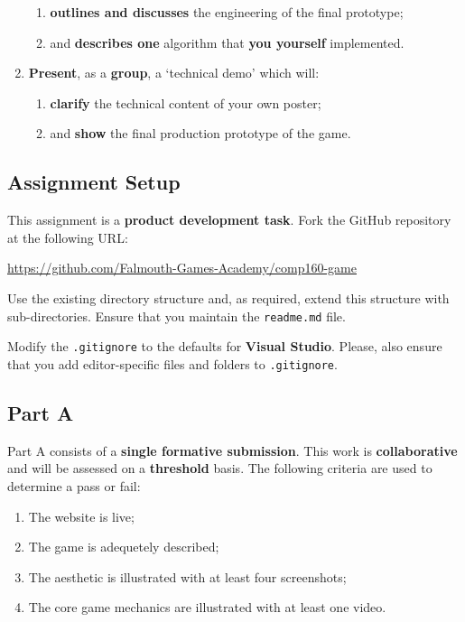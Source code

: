 \documentclass{../fal_assignment}
\begin{document}
\begin{enumerate}[label=(\Alph*)]
\begin{enumerate}[label=\roman*.]
    		\item \textbf{outlines and discusses} the engineering of the final prototype;
    		\item and \textbf{describes one} algorithm that \textbf{you yourself} implemented. 
	\end{enumerate}
    \item \textbf{Present}, as a \textbf{group}, a `technical demo' which will:
    	\begin{enumerate}[label=\roman*.]
    		\item \textbf{clarify} the technical content of your own poster;
    		\item and \textbf{show} the final production prototype of the game.
	\end{enumerate}
\end{enumerate}
  
\subsection*{Assignment Setup}

This assignment is a \textbf{product development task}. Fork the GitHub repository at the following URL:

\indent \url{https://github.com/Falmouth-Games-Academy/comp160-game}

Use the existing directory structure and, as required, extend this structure with sub-directories. Ensure that you maintain the \texttt{readme.md} file.

Modify the \texttt{.gitignore} to the defaults for \textbf{Visual Studio}. Please, also ensure that you add editor-specific files and folders to \texttt{.gitignore}. 

\subsection*{Part A}

Part A consists of a \textbf{single formative submission}. This work is \textbf{collaborative} and will be assessed on a \textbf{threshold} basis. The following criteria are used to determine a pass or fail:

\begin{enumerate}[label=(\alph*)]
	\item The website is live;
	\item The game is adequetely described;
	\item The aesthetic is illustrated with at least four screenshots;
	\item The core game mechanics are illustrated with at least one video.
\end{enumerate}
\end{document}
